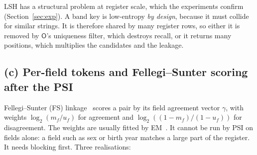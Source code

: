 \documentclass[10pt]{article}
\newcommand{\Op}{\mathsf{O}}
\begin{document}
LSH has a structural problem at register scale, which the experiments confirm (Section~\ref{sec:exp}). A band key is low-entropy \emph{by design}, because it must collide for similar strings. It is therefore shared by many register rows, so either it is removed by $\Op$'s uniqueness filter, which destroys recall, or it returns many positions, which multiplies the candidates and the leakage.

\subsection{(c) Per-field tokens and Fellegi--Sunter scoring after the PSI}
Fellegi--Sunter (FS) linkage~\cite{fellegi1969theory} scores a pair by its field agreement vector $\gamma$, with weights $\log_2(m_f/u_f)$ for agreement and $\log_2((1-m_f)/(1-u_f))$ for disagreement. The weights are usually fitted by EM~\cite{winkler1988using}. It cannot be run by PSI on fields alone: a field such as sex or birth year matches a large part of the register. It needs blocking first. Three realisations:
\end{document}
